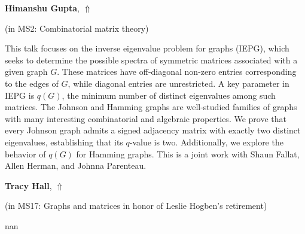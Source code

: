 \documentclass[ILAS2025-program.tex]{subfiles}
\begin{document}
     \hypertarget{down0264}{}\begin{ilasabstract}
    
    \textbf{Himanshu Gupta},  \hfill \hyperlink{up0264}{$\Uparrow$}
    
    (in {\color{mstitle}MS2: Combinatorial matrix theory})
        
        \mtskip
    This talk focuses on the inverse eigenvalue problem for graphs (IEPG), which seeks to determine the possible spectra of symmetric matrices associated with a given graph $G$. These matrices have off-diagonal non-zero entries corresponding to the edges of $G$, while diagonal entries are unrestricted. A key parameter in IEPG is $q(G)$, the minimum number of distinct eigenvalues among such matrices. The Johnson and Hamming graphs are well-studied families of graphs with many interesting combinatorial and algebraic properties. We prove that every Johnson graph admits a signed adjacency matrix with exactly two distinct eigenvalues, establishing that its $q$-value is two. Additionally, we explore the behavior of $q(G)$ for Hamming graphs. This is a joint work with Shaun Fallat, Allen Herman, and Johnna Parenteau. 
\end{ilasabstract}
     \hypertarget{down0377}{}\begin{ilasabstract}
    
    \textbf{Tracy Hall},  \hfill \hyperlink{up0377}{$\Uparrow$}
    
    (in {\color{mstitle}MS17: Graphs and matrices in honor of Leslie Hogben's retirement})
        
        \mtskip
    nan\end{ilasabstract}
\end{document}
